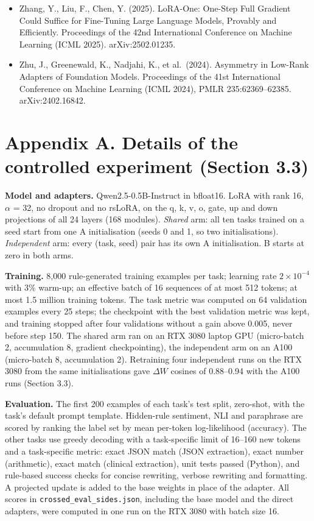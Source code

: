 \documentclass[
  11pt,
]{article}
\begin{document}
\begin{itemize}
  Zhang, L., Zhang, L., Shi, S., Chu, X., Li, B. (2023). LoRA-FA:
  Memory-efficient Low-rank Adaptation for Large Language Models
  Fine-tuning. arXiv:2308.03303v1.
\item
  Zhang, Y., Liu, F., Chen, Y. (2025). LoRA-One: One-Step Full Gradient
  Could Suffice for Fine-Tuning Large Language Models, Provably and
  Efficiently. Proceedings of the 42nd International Conference on
  Machine Learning (ICML 2025). arXiv:2502.01235.
\item
  Zhu, J., Greenewald, K., Nadjahi, K., et al.~(2024). Asymmetry in
  Low-Rank Adapters of Foundation Models. Proceedings of the 41st
  International Conference on Machine Learning (ICML 2024), PMLR
  235:62369--62385. arXiv:2402.16842.
\end{itemize}

\section{Appendix A. Details of the controlled experiment (Section
3.3)}\label{appendix-a.-details-of-the-controlled-experiment-section-3.3}

\textbf{Model and adapters.} Qwen2.5-0.5B-Instruct in bfloat16. LoRA
with rank 16, \ensuremath{\alpha} = 32, no dropout and no rsLoRA, on the q, k, v, o, gate,
up and down projections of all 24 layers (168 modules). \emph{Shared}
arm: all ten tasks trained on a seed start from one A initialisation
(seeds 0 and 1, so two initialisations). \emph{Independent} arm: every
(task, seed) pair has its own A initialisation. B starts at zero in both
arms.

\textbf{Training.} 8,000 rule-generated training examples per task;
learning rate \(2 \times 10^{-4}\) with 3\% warm-up; an effective batch
of 16 sequences of at most 512 tokens; at most 1.5 million training
tokens. The task metric was computed on 64 validation examples every 25
steps; the checkpoint with the best validation metric was kept, and
training stopped after four validations without a gain above 0.005,
never before step 150. The shared arm ran on an RTX 3080 laptop GPU
(micro-batch 2, accumulation 8, gradient checkpointing), the independent
arm on an A100 (micro-batch 8, accumulation 2). Retraining four
independent runs on the RTX 3080 from the same initialisations gave
\(\Delta W\) cosines of 0.88--0.94 with the A100 runs (Section 3.3).

\textbf{Evaluation.} The first 200 examples of each task's test split,
zero-shot, with the task's default prompt template. Hidden-rule
sentiment, NLI and paraphrase are scored by ranking the label set by
mean per-token log-likelihood (accuracy). The other tasks use greedy
decoding with a task-specific limit of 16--160 new tokens and a
task-specific metric: exact JSON match (JSON extraction), exact number
(arithmetic), exact match (clinical extraction), unit tests passed
(Python), and rule-based success checks for concise rewriting, verbose
rewriting and formatting. A projected update is added to the base
weights in place of the adapter. All scores in
\texttt{crossed\_\allowbreak{}eval\_\allowbreak{}sides.json}, including the base model and the
direct adapters, were computed in one run on the RTX 3080 with batch
size 16.
\end{document}
